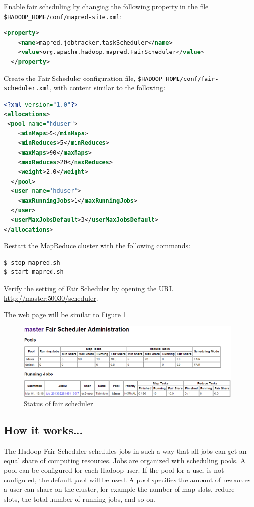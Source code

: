 Enable fair scheduling by changing the following property in the file \verb|$HADOOP_HOME/conf/mapred-site.xml|:
\lstset{style=bashstyle}
\begin{lstlisting}[language=XML]
  <property>
    <name>mapred.jobtracker.taskScheduler</name>
    <value>org.apache.hadoop.mapred.FairScheduler</value>
  </property>
\end{lstlisting}

Create the Fair Scheduler configuration file, \verb|$HADOOP_HOME/conf/fair-scheduler.xml|, with content similar to the following: 
\lstset{style=bashstyle}
\begin{lstlisting}[language=XML]
<?xml version="1.0"?> 
<allocations>
 <pool name="hduser">
    <minMaps>5</minMaps>
    <minReduces>5</minReduces>
    <maxMaps>90</maxMaps>
    <maxReduces>20</maxReduces>
    <weight>2.0</weight>
  </pool>
  <user name="hduser">
    <maxRunningJobs>1</maxRunningJobs>
  </user>
  <userMaxJobsDefault>3</userMaxJobsDefault>
</allocations>
\end{lstlisting}

Restart the MapReduce cluster with the following commands:
\lstset{style=bashstyle}
\begin{lstlisting}[language=bash]
$ stop-mapred.sh
$ start-mapred.sh
\end{lstlisting}

Verify the setting of Fair Scheduler by opening the URL \url{http://master:50030/scheduler}.

The web page will be similar to Figure \ref{fig:fairscheduler}.
\begin{figure}[ht]
  \centering
  \includegraphics[width=.90\textwidth]{figs/5163os_04_16.png}
  \caption{Status of fair scheduler}\label{fig:fairscheduler}
\end{figure} 
\subsection*{How it works...}
The Hadoop Fair Scheduler schedules jobs in such a way that all jobs can get an equal share of computing resources. Jobs are organized with scheduling pools. A pool can be configured for each Hadoop user. If the pool for a user is not configured, the default pool will be used. A pool specifies the amount of resources a user can share on the cluster, for example the number of map slots, reduce slots, the total number of running jobs, and so on.

